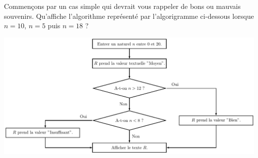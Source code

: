 Commençons par un cas simple qui devrait vous rappeler de bons ou mauvais souvenirs. Qu'affiche l'algorithme représenté par l'algorigramme ci-dessous lorsque $n=10$, $n=5$ puis $n=18$ ?
\begin{center}
	\includegraphics[width=1\textwidth]{reading/draw/text.pdf}
\end{center}
